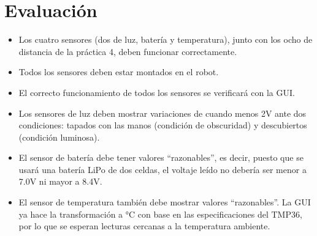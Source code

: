 \documentclass[a4paper,12pt]{article}
\begin{document}
\section{Evaluación}
\begin{itemize}
\item Los cuatro sensores (dos de luz, batería y temperatura), junto con los ocho de distancia de la práctica 4, deben funcionar correctamente.
\item Todos los sensores deben estar montados en el robot.
\item El correcto funcionamiento de todos los sensores se verificará con la GUI.
\item Los sensores de luz deben mostrar variaciones de cuando menos 2V ante dos condiciones: tapados con las manos (condición de obscuridad) y descubiertos (condición luminosa).
\item El sensor de batería debe tener valores ``razonables'', es decir, puesto que se usará una batería LiPo de dos celdas, el voltaje leído no debería ser menor a 7.0V ni mayor a 8.4V.
\item El sensor de temperatura también debe mostrar valores ``razonables''. La GUI ya hace la transformación a \si{\degree}C con base en las especificaciones del TMP36, por lo que se esperan lecturas cercanas a la temperatura ambiente. 
\end{itemize}
\end{document}
